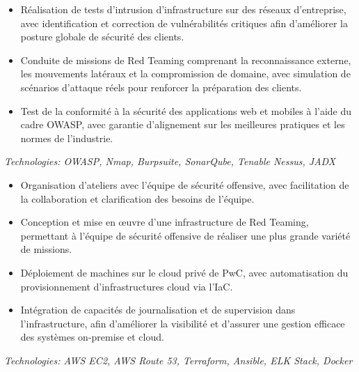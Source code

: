 \vspace{-4mm}
\begin{itemize}
    \small
    \setlength\itemsep{0cm}
    \item Réalisation de tests d’intrusion d’infrastructure sur des réseaux d’entreprise, avec identification et correction de vulnérabilités critiques afin d’améliorer la posture globale de sécurité des clients.
    \item Conduite de missions de Red Teaming comprenant la reconnaissance externe, les mouvements latéraux et la compromission de domaine, avec simulation de scénarios d’attaque réels pour renforcer la préparation des clients.
    \item Test de la conformité à la sécurité des applications web et mobiles à l’aide du cadre OWASP, avec garantie d’alignement sur les meilleures pratiques et les normes de l’industrie.
\end{itemize}
\vspace{-1mm}
\textit{Technologies: OWASP, Nmap, Burpsuite, SonarQube, Tenable Nessus, JADX}
\vspace{4mm}

\vspace{-4mm}
\begin{itemize}
    \small
    \setlength\itemsep{0cm}
    \item Organisation d’ateliers avec l’équipe de sécurité offensive, avec facilitation de la collaboration et clarification des besoins de l’équipe.
    \item Conception et mise en œuvre d’une infrastructure de Red Teaming, permettant à l’équipe de sécurité offensive de réaliser une plus grande variété de missions.
    \item Déploiement de machines sur le cloud privé de PwC, avec automatisation du provisionnement d’infrastructures cloud via l’IaC.
    \item Intégration de capacités de journalisation et de supervision dans l’infrastructure, afin d’améliorer la visibilité et d’assurer une gestion efficace des systèmes on-premise et cloud.
\end{itemize}
\vspace{-1mm}
\textit{Technologies: AWS EC2, AWS Route 53, Terraform, Ansible, ELK Stack, Docker}